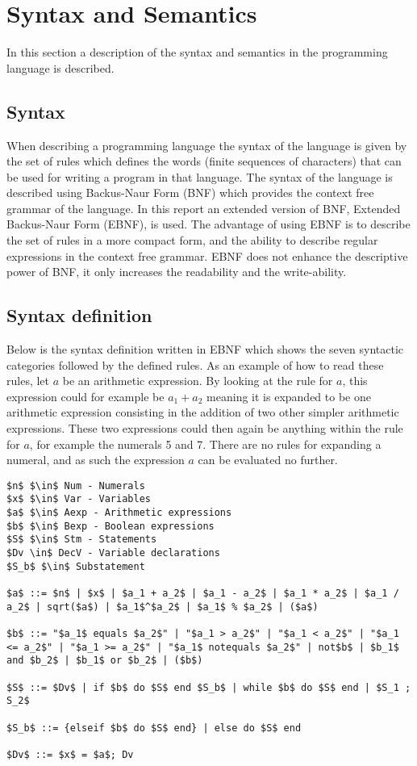 \chapter{Syntax and Semantics}\label{analysis:syntax-and-semantics}
In this section a description of the syntax and semantics in the programming language is described.

\section{Syntax}
When describing a programming language the syntax of the language is given by the set of rules which defines the words (finite sequences of characters) that can be used for writing a program in that language. The syntax of the language is described using Backus-Naur Form (BNF) which provides the context free grammar of the language.
In this report an extended version of BNF, Extended Backus-Naur Form (EBNF), is used. The advantage of using EBNF is to describe the set of rules in a more compact form, and the ability to describe regular expressions in the context free grammar. EBNF does not enhance the descriptive power of BNF, it only increases the readability and the write-ability.

\section{Syntax definition}\label{sec:anlysis:syntax-definition}
Below is the syntax definition written in EBNF which shows the seven syntactic categories followed by the defined rules. As an example of how to read these rules, let $a$ be an arithmetic expression. By looking at the rule for $a$, this expression could for example be $a_1 + a_2$ meaning it is expanded to be one arithmetic expression consisting in the addition of two other simpler arithmetic expressions. These two expressions could then again be anything within the rule for $a$, for example the numerals 5 and 7. There are no rules for expanding a numeral, and as such the expression $a$ can be evaluated no further.
\begin{lstlisting}[mathescape, captionpos=b, caption={Syntax formation rules}, label={lst:syntax-formation}]
$n$ $\in$ Num - Numerals
$x$ $\in$ Var - Variables
$a$ $\in$ Aexp - Arithmetic expressions
$b$ $\in$ Bexp - Boolean expressions
$S$ $\in$ Stm - Statements
$Dv \in$ DecV - Variable declarations
$S_b$ $\in$ Substatement

$a$ ::= $n$ | $x$ | $a_1 + a_2$ | $a_1 - a_2$ | $a_1 * a_2$ | $a_1 / a_2$ | sqrt($a$) | $a_1$^$a_2$ | $a_1$ % $a_2$ | ($a$)

$b$ ::= "$a_1$ equals $a_2$" | "$a_1 > a_2$" | "$a_1 < a_2$" | "$a_1 <= a_2$" | "$a_1 >= a_2$" | "$a_1$ notequals $a_2$" | not$b$ | $b_1$ and $b_2$ | $b_1$ or $b_2$ | ($b$)

$S$ ::= $Dv$ | if $b$ do $S$ end $S_b$ | while $b$ do $S$ end | $S_1 ; S_2$

$S_b$ ::= {elseif $b$ do $S$ end} | else do $S$ end

$Dv$ ::= $x$ = $a$; Dv
\end{lstlisting}


